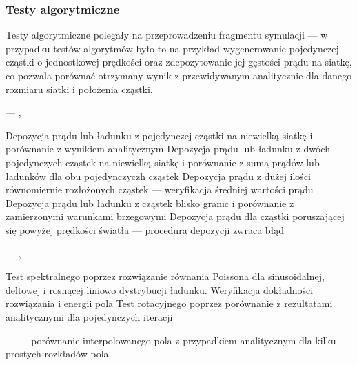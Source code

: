     \subsubsection{Testy algorytmiczne}
    Testy algorytmiczne polegały na przeprowadzeniu fragmentu symulacji --- w
    przypadku testów algorytmów było to na przykład wygenerowanie pojedynczej
    cząstki o jednostkowej prędkości oraz zdepozytowanie jej gęstości prądu na
    siatkę, co pozwala porównać otrzymany wynik z przewidywanym analitycznie
    dla danego rozmiaru siatki i położenia cząstki.
    \begin{enumerate}
        \itemi{}  --- , 
            \begin{enumerate}
                \itemii{} Depozycja prądu lub ładunku z pojedynczej cząstki na niewielką siatkę i porównanie z wynikiem analitycznym\cite{Jablonski-notes}
                \itemii{} Depozycja prądu lub ładunku z dwóch pojedynczych cząstek na niewielką
                    siatkę i porównanie z sumą prądów lub ładunków dla obu pojedynczyczh
                    cząstek
                \itemii{} Depozycja prądu z dużej ilości równomiernie rozłożonych
                    cząstek --- weryfikacja średniej wartości prądu
                \itemii{} Depozycja prądu lub ładunku z cząstek blisko granic i porównanie z zamierzonymi warunkami brzegowymi
                \itemii{} Depozycja prądu dla cząstki poruszającej się powyżej prędkości światła --- procedura depozycji zwraca błąd
            \end{enumerate}

        \itemi{}  --- , 
            \begin{enumerate}
                \itemii{} Test  spektralnego poprzez
                    rozwiązanie równania Poissona dla sinusoidalnej, deltowej i rosnącej liniowo
                    dystrybucji ładunku. Weryfikacja dokładności rozwiązania i energii pola
                \itemii{} Test  rotacyjnego poprzez porównanie z rezultatami analitycznymi dla pojedynczych iteracji
            \end{enumerate}

        \itemi{}  ---  --- porównanie interpolowanego pola z przypadkiem analitycznym dla kilku prostych rozkładów pola


\end{enumerate}
